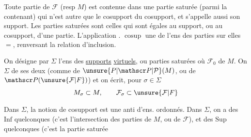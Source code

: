 
Toute partie de $\mathcal F$ (resp $M$) est contenue dans une partie saturée  (parmi  la contenant) qui  n'est autre que le cosupport du cosupport, et s'appelle aussi son support. Les parties saturées sont celles qui sont égales au support, ou au cosupport, d'une partie. L'application . $\operatorname{cosup}$  une  de l'ens des parties  sur elles $=$, renversant la relation d'inclusion.

On désigne par $\Sigma$ l'ens des \uline{supports} \uline{virtuels}, ou parties saturées
où  $\mathcal F_0$ de $M$.   On  $\Sigma$ de  ses deux 
 (comme  de $\unsure{P|\mathscr P|\mathcal P}(M)$, ou de $\mathscr P(\unsure{\mathcal F|F})$) et on écrit, pour $\sigma\in\Sigma$
\[
M_\sigma\subset M,\qquad\mathcal F_\sigma\subset\unsure{\mathcal F|F}
\]

Dans $\Sigma$,  la notion de cosupport est une anti d'ens. ordonnés. Dans $\Sigma$, on a des $\mathrm{Inf}$ quelconques (c'est l'intersection des parties de $M$, ou de $\mathcal F$), et des $\mathrm{Sup}$ quelconques (c'est la partie saturée
